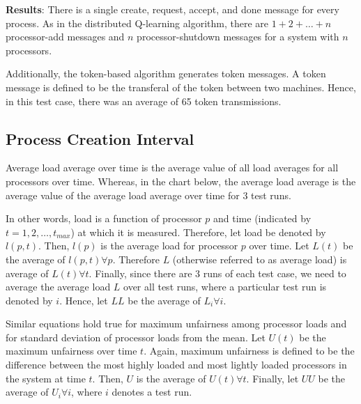 \documentclass{report}
\begin{document}
\textbf{Results}: There is a single create, request, accept, and done
message for every process.  As in the distributed Q-learning algorithm,
there are $1 + 2 + \dots + n$ processor-add messages and $n$
processor-shutdown messages for a system with $n$ processors.

Additionally, the token-based algorithm generates token messages.  A token
message is defined to be the transferal of the token between two machines.
Hence, in this test case, there was an average of 65 token transmissions.


\subsection{Process Creation Interval}

Average load average over time is the average value of all load averages for
all processors over time.  Whereas, in the chart below, the average load
average is the average value of the average load average over time for 3
test runs.  


In other words, load is a function of processor $p$ and time (indicated by
$t=1, 2, \dots, t_{max}$) at which it is measured.  Therefore, let load be
denoted by $l (p, t)$.  Then, $l(p)$ is the average load for processor
$p$ over time.  Let $L(t)$ be the average of $l(p, t) \forall p$.  Therefore
$L$ (otherwise referred to as average load) is average of $L(t) \forall t$.
Finally, since there are 3 runs of each test case, we need to average the
average load $L$ over all test runs, where a particular test run is denoted
by $i$.  Hence, let $LL$ be the average of $L_i \forall i$.

Similar equations hold true for maximum unfairness among processor loads and
for standard deviation of processor loads from the mean.  Let $U(t)$ be the
maximum unfairness over time $t$.  Again, maximum unfairness is defined to
be the difference between the most highly loaded and most lightly loaded
processors in the system at time $t$.  Then, $U$ is the average of $U(t)
\forall t$.  Finally, let $UU$ be the average of $U_i \forall i$, where $i$
denotes a test run.
\end{document}

